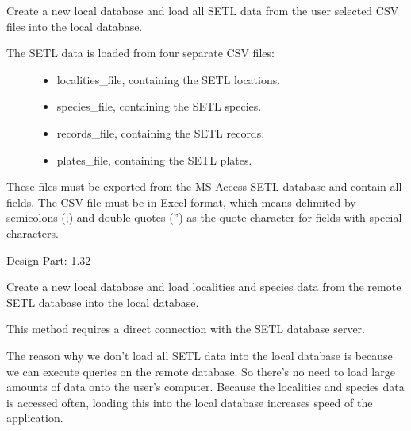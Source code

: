 \documentclass[letterpaper,10pt,english]{sphinxmanual}
\begin{document}
\begin{fulllineitems}

\begin{fulllineitems}
\label{setlyze/database:setlyze.database.MakeLocalDB.insert_from_csv}
Create a new local database and load all SETL data from the
user selected CSV files into the local database.
\begin{description}
\item[{The SETL data is loaded from four separate CSV files:}] \leavevmode\begin{itemize}
\item {} 
localities\_file, containing the SETL locations.

\item {} 
species\_file, containing the SETL species.

\item {} 
records\_file, containing the SETL records.

\item {} 
plates\_file, containing the SETL plates.

\end{itemize}

\end{description}

These files must be exported from the MS Access SETL database
and contain all fields. The CSV file must be in Excel format,
which means delimited by semicolons (;) and double quotes ('') as
the quote character for fields with special characters.

Design Part: 1.32

\end{fulllineitems}


\begin{fulllineitems}
\label{setlyze/database:setlyze.database.MakeLocalDB.insert_from_db}
Create a new local database and load localities and species
data from the remote SETL database into the local database.

This method requires a direct connection with the SETL
database server.

The reason why we don't load all SETL data into the local database
is because we can execute queries on the remote database. So
there's no need to load large amounts of data onto the user's
computer. Because the localities and species data is accessed
often, loading this into the local database increases speed of
the application.


\end{fulllineitems}
\end{fulllineitems}
\end{document}
